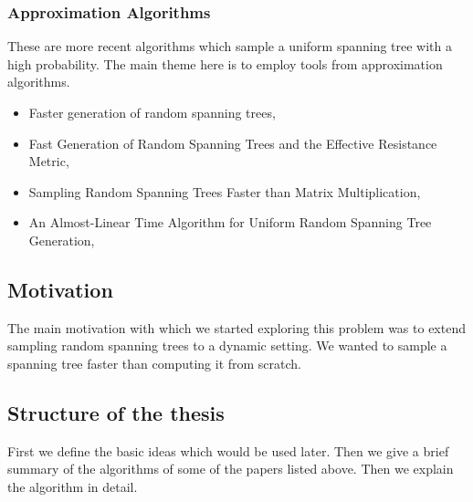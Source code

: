 \subsubsection{Approximation Algorithms}
These are more recent algorithms which sample a uniform spanning tree with a high probability. The main theme here is to employ tools from approximation algorithms. 
\begin{itemize}
\item Faster generation of random spanning trees, \cite{10.5555/1747597.1748019}
\item Fast Generation of Random Spanning Trees and the Effective Resistance Metric, \cite{10.5555/2722129.2722263}
\item Sampling Random Spanning Trees Faster than Matrix Multiplication, \cite{10.1145/3055399.3055499}
\item An Almost-Linear Time Algorithm for Uniform Random Spanning Tree Generation, \cite{10.1145/3188745.3188852}
\end{itemize}

\subsection{Motivation}

The main motivation with which we started exploring this problem was to extend sampling random spanning trees to a dynamic setting. We wanted to sample a spanning tree faster than computing it from scratch. 

\subsection{Structure of the thesis}

First we define the basic ideas which would be used later. Then we give a brief summary of the algorithms of some of the papers listed above. Then we explain the \citet{harvey2016generating} algorithm in detail.



